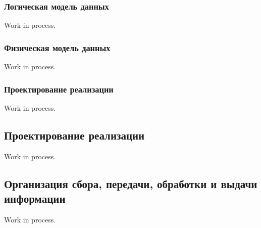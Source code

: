 \subsubsection{Логическая модель данных}

Work in process.

\subsubsection{Физическая модель данных}

Work in process.

\subsubsection{Проектирование реализации}

Work in process.

\subsection{Проектирование реализации}

Work in process.

\subsection{Организация сбора, передачи, обработки и выдачи информации}

Work in process.

\clearpage
\newpage
